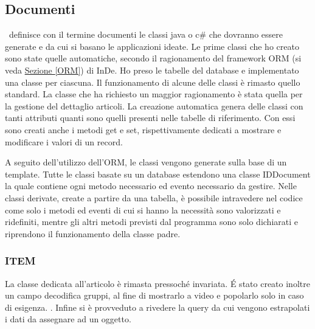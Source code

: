\subsection{Documenti}
\inde\ definisce con il termine documenti le classi java o c\# che dovranno essere generate e da cui si basano le applicazioni ideate.
Le prime classi che ho creato sono state quelle automatiche, secondo il ragionamento del framework ORM (si veda \hyperref[ORM]{Sezione \ref{ORM}}) di InDe. Ho preso le tabelle del database e implementato una classe per ciascuna. Il funzionamento di alcune delle classi è rimasto quello standard. La classe che ha richiesto un  maggior ragionamento è stata quella per la gestione del dettaglio articoli.
La creazione automatica genera delle classi con tanti attributi quanti sono quelli presenti nelle tabelle di riferimento. Con essi sono creati anche i metodi get e set, rispettivamente dedicati a mostrare e modificare i valori di un record.

A seguito dell'utilizzo dell'ORM, le classi vengono generate sulla base di un template. Tutte le classi basate su un database estendono una classe IDDocument la quale contiene ogni metodo necessario ed evento necessario da gestire. Nelle classi derivate, create a partire da una tabella, è possibile intravedere nel codice come solo i metodi ed eventi di cui si hanno la necessità sono valorizzati e ridefiniti, mentre gli altri metodi previsti dal programma sono solo dichiarati e riprendono il funzionamento della classe padre.


\subsubsection{ITEM}
La classe dedicata all'articolo è rimasta pressoché invariata. \'E stato creato inoltre un campo decodifica gruppi, al fine di mostrarlo a video e popolarlo solo in caso di esigenza. . Infine si è provveduto a rivedere la query da cui vengono estrapolati i dati da assegnare ad un oggetto.

